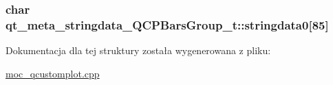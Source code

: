 \subsubsection[{\texorpdfstring{stringdata0}{stringdata0}}]{\setlength{\rightskip}{0pt plus 5cm}char qt\+\_\+meta\+\_\+stringdata\+\_\+\+Q\+C\+P\+Bars\+Group\+\_\+t\+::stringdata0\mbox{[}85\mbox{]}}\hypertarget{structqt__meta__stringdata___q_c_p_bars_group__t_a2dd46435dea832cba9d6432a1b729650}{}\label{structqt__meta__stringdata___q_c_p_bars_group__t_a2dd46435dea832cba9d6432a1b729650}


Dokumentacja dla tej struktury została wygenerowana z pliku\+:\begin{DoxyCompactItemize}
\item 
\hyperlink{moc__qcustomplot_8cpp}{moc\+\_\+qcustomplot.\+cpp}\end{DoxyCompactItemize}
